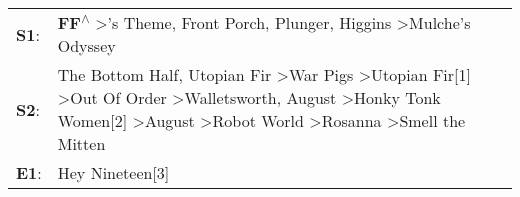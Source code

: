 \begin{supertabular}{p{0.03\textwidth}p{0.92\textwidth}}
 \textbf{S1}:  &                                                                                                                                                                                                                                                                                                                                       \textbf{FF\textsuperscript{$\wedge$}} \textgreater {}'s Theme\textsuperscript{}, \enspace Front Porch\textsuperscript{}, \enspace Plunger\textsuperscript{}, \enspace Higgins\textsuperscript{} \textgreater \enspace Mulche's Odyssey\textsuperscript{}  \enspace  \\
 \textbf{S2}:  &  The Bottom Half\textsuperscript{}, \enspace Utopian Fir\textsuperscript{} \textgreater \enspace War Pigs\textsuperscript{} \textgreater \enspace Utopian Fir[1]\textsuperscript{} \textgreater \enspace Out Of Order\textsuperscript{} \textgreater \enspace Walletsworth\textsuperscript{}, \enspace August\textsuperscript{} \textgreater \enspace Honky Tonk Women[2]\textsuperscript{} \textgreater \enspace August\textsuperscript{} \textgreater \enspace Robot World\textsuperscript{} \textgreater \enspace Rosanna\textsuperscript{} \textgreater \enspace Smell the Mitten\textsuperscript{}  \enspace  \\
 \textbf{E1}:  &                                                                                                                                                                                                                                                                                                                                                                                                                                                                                                                                                                       Hey Nineteen[3]\textsuperscript{}  \enspace  \\
\end{supertabular}
